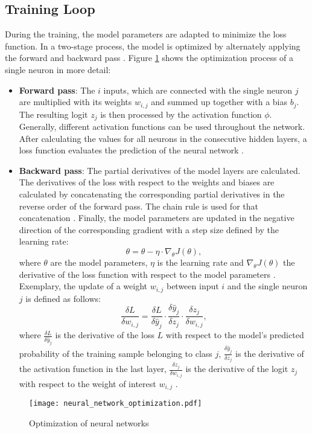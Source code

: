 \subsection{Training Loop}
During the training, the model parameters are adapted to minimize the loss function. In a two-stage process, the model is optimized by alternately applying the forward and backward pass \cite{ShilohPerl2020}. Figure  \ref{fig:neural_network_optimization} shows the optimization process of a single neuron in more detail:
\begin{itemize}
    \item \textbf{Forward pass}: The $i$ inputs, which are connected with the single neuron $j$ are multiplied with its weights $w_{i,j}$ and summed up together with a bias $b_{j}$. The resulting logit $z_{j}$ is then processed by the activation function $\phi$. Generally, different activation functions can be used throughout the network. After calculating the values for all neurons in the consecutive hidden layers, a loss function evaluates the prediction of the neural network \cite{AN201942}.
    \item \textbf{Backward pass}: 
    The partial derivatives of the model layers are calculated. The derivatives of the loss with respect to the weights and biases are calculated by concatenating the corresponding partial derivatives in the reverse order of the forward pass. The chain rule is used for that concatenation \cite{ShilohPerl2020}. Finally, the model parameters are updated in the negative direction of the corresponding gradient with a step size defined by the learning rate:
    \begin{equation}
        \theta = \theta - \eta \cdot {\nabla}_{\theta}J(\theta),
    \end{equation}
    where $\theta$ are the model parameters, $\eta$ is the learning rate and ${\nabla}_{\theta}J(\theta)$ the derivative of the loss function with respect to the model parameters \cite{Lydia2019}. Exemplary, the update of a weight $w_{i,j}$ between input $i$ and the single neuron $j$ is defined as follows:
    \begin{equation}
     \frac{\delta L}{\delta w_{i,j}} = \frac{\delta L}{\delta \hat{y}_{j}} \cdot \frac{\delta \hat{y}_{j}}{\delta z_{j}} \cdot \frac{\delta z_{j}}{\delta w_{i,j}}, 
     \label{chain_rule}
    \end{equation}
where $\frac{\delta L}{\delta \hat{y}_{j}}$ is the derivative of the loss $L$ with respect to the model's predicted probability of the training sample belonging to class $j$, $\frac{\delta \hat{y}_{j}}{\delta z_{j}}$ is the derivative of the activation function in the last layer, $ \frac{\delta z_{j}}{\delta w_{i,j}}$ is the derivative of the logit $z_{j}$ with respect to the weight of interest $w_{i,j}$ \cite{ShilohPerl2020}. 
\end{itemize}
\begin{figure}[H]
  \centering
  \texttt{[image: neural\_network\_optimization.pdf]}
  \caption {Optimization of neural networks}
  \label{fig:neural_network_optimization}
\end{figure}

